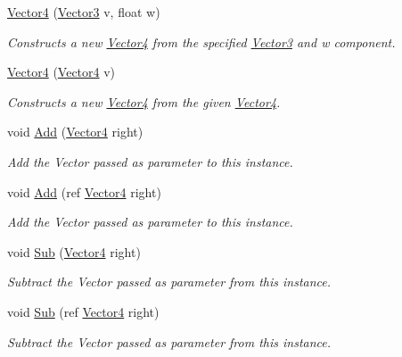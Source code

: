 \begin{DoxyCompactItemize}
\hyperlink{struct_open_t_k_1_1_vector4_a7ecb6fb65ed9b77165a0eb9f0c4c7731}{Vector4} (\hyperlink{struct_open_t_k_1_1_vector3}{Vector3} v, float w)
\begin{DoxyCompactList}\small\item\em Constructs a new \hyperlink{struct_open_t_k_1_1_vector4}{Vector4} from the specified \hyperlink{struct_open_t_k_1_1_vector3}{Vector3} and w component. \end{DoxyCompactList}\item 
\hyperlink{struct_open_t_k_1_1_vector4_a1427b48150463a062608d2cfa8c15e90}{Vector4} (\hyperlink{struct_open_t_k_1_1_vector4}{Vector4} v)
\begin{DoxyCompactList}\small\item\em Constructs a new \hyperlink{struct_open_t_k_1_1_vector4}{Vector4} from the given \hyperlink{struct_open_t_k_1_1_vector4}{Vector4}. \end{DoxyCompactList}\item 
void \hyperlink{struct_open_t_k_1_1_vector4_a013c6a6eae2201e1a5168419e98c37e1}{Add} (\hyperlink{struct_open_t_k_1_1_vector4}{Vector4} right)
\begin{DoxyCompactList}\small\item\em Add the Vector passed as parameter to this instance.\end{DoxyCompactList}\item 
void \hyperlink{struct_open_t_k_1_1_vector4_a42356c7df1d2c2be02e445976a6d201d}{Add} (ref \hyperlink{struct_open_t_k_1_1_vector4}{Vector4} right)
\begin{DoxyCompactList}\small\item\em Add the Vector passed as parameter to this instance.\end{DoxyCompactList}\item 
void \hyperlink{struct_open_t_k_1_1_vector4_af4d1e6879daed0ec876b194e3ce6bf6a}{Sub} (\hyperlink{struct_open_t_k_1_1_vector4}{Vector4} right)
\begin{DoxyCompactList}\small\item\em Subtract the Vector passed as parameter from this instance.\end{DoxyCompactList}\item 
void \hyperlink{struct_open_t_k_1_1_vector4_a1dbb7dfe23d60d4fcdea3909fba61a2c}{Sub} (ref \hyperlink{struct_open_t_k_1_1_vector4}{Vector4} right)
\begin{DoxyCompactList}\small\item\em Subtract the Vector passed as parameter from this instance.\end{DoxyCompactList}\item 

\end{DoxyCompactItemize}
